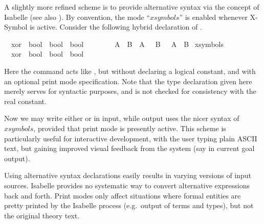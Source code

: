 \begin{isabellebody}
\begin{isamarkuptext}
  \medskip A slightly more refined scheme is to provide alternative
  syntax via the  concept of Isabelle (see also
  \cite{isabelle-ref}).  By convention, the mode ``$xsymbols$'' is
  enabled whenever X-Symbol is active.  Consider the following hybrid
  declaration of .%
\end{isamarkuptext}%
\isamarkuptrue%
\isamarkupfalse%
\isamarkupfalse%
\isanewline
\ \ xor\ {\isacharcolon}{\isacharcolon}\ {\isachardoublequote}bool\ {\isasymRightarrow}\ bool\ {\isasymRightarrow}\ bool{\isachardoublequote}\ \ \ \ {\isacharparenleft}\ {\isachardoublequote}{\isacharbrackleft}{\isacharplus}{\isacharbrackright}{\isasymignore}{\isachardoublequote}\ {}{}{\isacharparenright}\isanewline
\ \ {\isachardoublequote}A\ {\isacharbrackleft}{\isacharplus}{\isacharbrackright}{\isasymignore}\ B\ {\isasymequiv}\ {\isacharparenleft}A\ {\isasymand}\ {\isasymnot}\ B{\isacharparenright}\ {\isasymor}\ {\isacharparenleft}{\isasymnot}\ A\ {\isasymand}\ B{\isacharparenright}{\isachardoublequote}\isanewline
\isanewline
\isamarkupfalse%
\ {\isacharparenleft}xsymbols{\isacharparenright}\isanewline
\ \ xor\ {\isacharcolon}{\isacharcolon}\ {\isachardoublequote}bool\ {\isasymRightarrow}\ bool\ {\isasymRightarrow}\ bool{\isachardoublequote}\ \ \ \ {\isacharparenleft}\ {\isachardoublequote}{\isasymoplus}{\isasymignore}{\isachardoublequote}\ {}{}{\isacharparenright}\isamarkupfalse%
\isamarkupfalse%
%
\begin{isamarkuptext}%
Here the  command acts like , but
  without declaring a logical constant, and with an optional print
  mode specification.  Note that the type declaration given here
  merely serves for syntactic purposes, and is not checked for
  consistency with the real constant.

  \medskip Now we may write either \isa{{\isacharbrackleft}{\isacharplus}{\isacharbrackright}} or \isa{{\isasymoplus}} in
  input, while output uses the nicer syntax of $xsymbols$, provided
  that print mode is presently active.  This scheme is particularly
  useful for interactive development, with the user typing plain ASCII
  text, but gaining improved visual feedback from the system (say in
  current goal output).

  \begin{warn}
  Using alternative syntax declarations easily results in varying
  versions of input sources.  Isabelle provides no systematic way to
  convert alternative expressions back and forth.  Print modes only
  affect situations where formal entities are pretty printed by the
  Isabelle process (e.g.\ output of terms and types), but not the
  original theory text.
  \end{warn}


\end{isamarkuptext}
\end{isabellebody}
